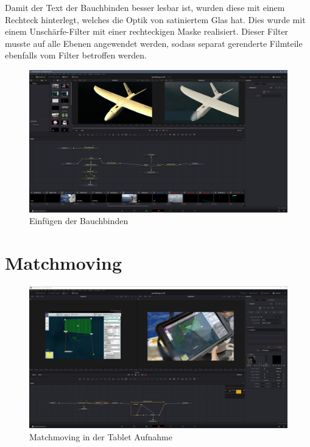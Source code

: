 Damit der Text der Bauchbinden besser lesbar ist, wurden diese mit einem Rechteck hinterlegt, welches die Optik von satiniertem Glas hat. Dies wurde mit einem Unschärfe-Filter mit einer rechteckigen Maske realisiert. Dieser Filter musste auf alle Ebenen angewendet werden, sodass separat gerenderte Filmteile ebenfalls vom Filter betroffen werden.

\begin{figure}[H]
\begin{center}
\includegraphics[width=\textwidth]{gfx/post/resolve3.jpg}
\caption{Einfügen der Bauchbinden}
\label{resolve3}
\end{center}
\end{figure}

\section{Matchmoving}

\begin{figure}[H]
\begin{center}
\includegraphics[width=\textwidth]{gfx/post/resolve9.jpg}
\caption{Matchmoving in der Tablet Aufnahme}
\label{resolve8}
\end{center}
\end{figure}


